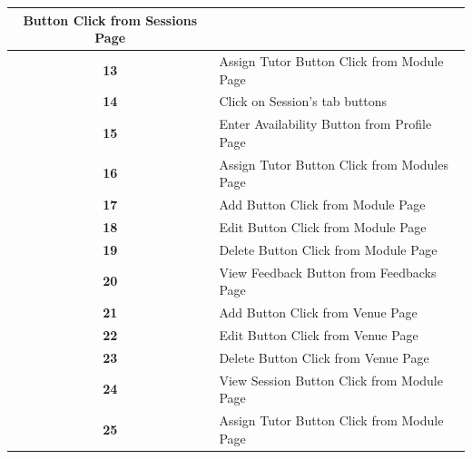 \begin{justify}
\begin{table}[H]
\begin{tabular}{|c|l|}
          Button Click from Sessions Page                   \\
        \hline
        \textbf{ 13 }                                       & Assign Tutor
          Button Click from Module Page                     \\
        \hline
        \textbf{ 14 }                                       & Click on
          Session’s tab buttons                                 \\
        \hline
        \textbf{ 15 }                                       & Enter
          Availability Button from Profile Page                    \\
        \hline
        \textbf{ 16 }                                       & Assign Tutor
          Button Click from Modules Page                    \\
        \hline
        \textbf{ 17 }                                       & Add Button
          Click from Module Page                              \\
        \hline
        \textbf{ 18 }                                       & Edit Button
          Click from Module Page                             \\
        \hline
        \textbf{ 19 }                                       & Delete Button
          Click from Module Page                           \\
        \hline
        \textbf{ 20 }                                       & View Feedback
          Button from Feedbacks Page                       \\
        \hline
        \textbf{ 21 }                                       & Add Button
          Click from Venue Page                               \\
        \hline
        \textbf{ 22 }                                       & Edit Button
          Click from Venue Page                              \\
        \hline
        \textbf{ 23 }                                       & Delete Button
          Click from Venue Page                            \\
        \hline
        \textbf{ 24 }                                       & View Session
          Button Click from Module Page                     \\
        \hline
        \textbf{ 25 }                                       & Assign Tutor
          Button Click from Module Page                     \\

\end{tabular}
\end{table}
\end{justify}
